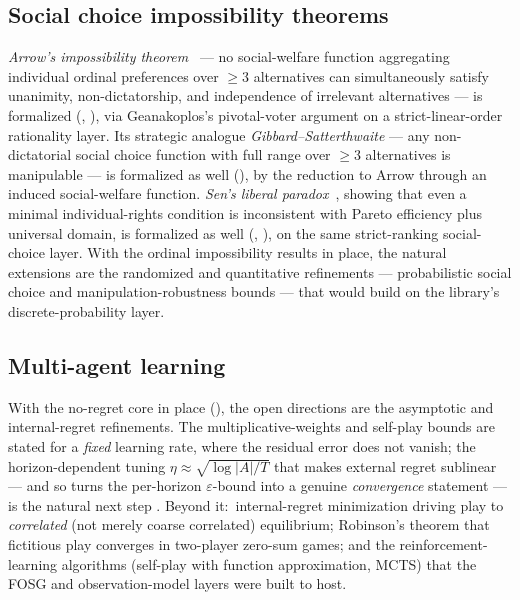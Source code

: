 \subsection{Social choice impossibility theorems}
\label{sec:future:social-choice}

\emph{Arrow's impossibility theorem}~\citep{Arrow1951} — no
social-welfare function aggregating individual ordinal preferences
over $\ge 3$ alternatives can simultaneously satisfy unanimity,
non-dictatorship, and independence of irrelevant alternatives — is
formalized (, ),
via Geanakoplos's pivotal-voter argument on a strict-linear-order
rationality layer.  Its strategic analogue
\emph{Gibbard–Satterthwaite} \citep{Gibbard1973, Satterthwaite1975}
— any non-dictatorial social choice function with full range over
$\ge 3$ alternatives is manipulable — is formalized as well
(), by the reduction to
Arrow through an induced social-welfare function.
\emph{Sen's liberal paradox}~\citep{Sen1970}, showing that even a
minimal individual-rights condition is inconsistent with Pareto
efficiency plus universal domain, is formalized as well
(, ), on
the same strict-ranking social-choice layer.  With the ordinal
impossibility results in place, the natural extensions are the
randomized and quantitative refinements — probabilistic social choice
and manipulation-robustness bounds — that would build on the library's
discrete-probability layer.

\subsection{Multi-agent learning}
\label{sec:future:learning}

With the no-regret core in place (), the
open directions are the asymptotic and internal-regret refinements.
The multiplicative-weights and self-play bounds are stated for a
\emph{fixed} learning rate, where the residual error does not
vanish; the horizon-dependent tuning $\eta \approx \sqrt{\log|A|/T}$
that makes external regret sublinear — and so turns the per-horizon
$\varepsilon$-bound into a genuine \emph{convergence} statement — is
the natural next step \citep{Cesa-BianchiLugosi2006,
BlumMansour2007}.  Beyond it:\ internal-regret minimization driving
play to \emph{correlated} (not merely coarse correlated)
equilibrium; Robinson's theorem that fictitious play converges in
two-player zero-sum games; and the reinforcement-learning algorithms
(self-play with function approximation, MCTS) that the FOSG and
observation-model layers were built to host.


